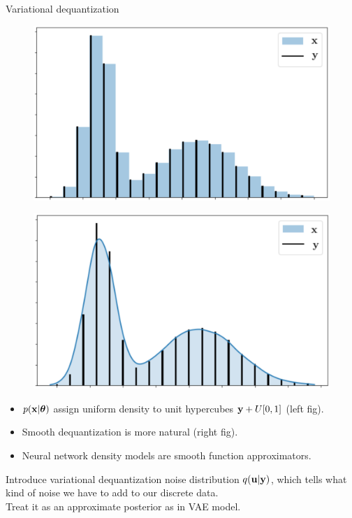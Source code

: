 \begin{frame}{Variational dequantization}
	\begin{minipage}[t]{0.5\columnwidth}
		\begin{figure}
			\centering
			\includegraphics[width=0.8\linewidth]{figs/uniform_dequantization.png}
		\end{figure}
	\end{minipage}%
	\begin{minipage}[t]{0.5\columnwidth}
		\begin{figure}
			\centering
			\includegraphics[width=0.8\linewidth]{figs/variational_dequantization.png}
		\end{figure}
	\end{minipage}
	\begin{itemize}
		\item $p(\mathbf{x} | \boldsymbol{\theta})$ assign uniform density to unit hypercubes $\mathbf{y} + U[0, 1]$ (left fig).
		\item Smooth dequantization is more natural (right fig).
		\item Neural network density models are smooth function approximators.
	\end{itemize}
	Introduce variational dequantization noise distribution $q(\mathbf{u} | \mathbf{y})$, which tells what kind of noise we have to add to our discrete data.  \\
	Treat it as an approximate posterior as in VAE model. 
\end{frame}
